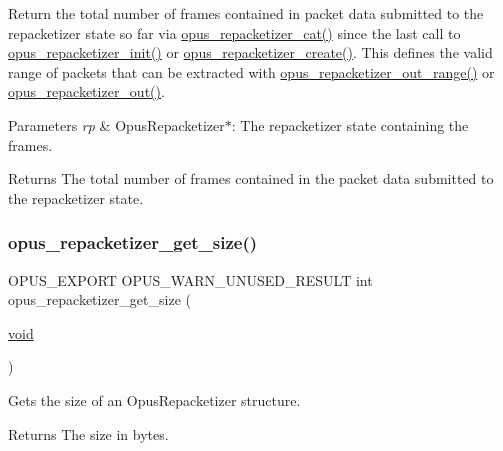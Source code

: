 Return the total number of frames contained in packet data submitted to the repacketizer state so far via \hyperlink{group__opus__repacketizer_gaa739f0bbc0ad09ad159ffb6455a6bb55}{opus\+\_\+repacketizer\+\_\+cat()} since the last call to \hyperlink{group__opus__repacketizer_gadef533688e80dcc96a32b955657aaf28}{opus\+\_\+repacketizer\+\_\+init()} or \hyperlink{group__opus__repacketizer_gaa70e9708619188f673b5dc3f494c46ea}{opus\+\_\+repacketizer\+\_\+create()}. This defines the valid range of packets that can be extracted with \hyperlink{group__opus__repacketizer_gad06762a8f4032823f6b64b63e8416efc}{opus\+\_\+repacketizer\+\_\+out\+\_\+range()} or \hyperlink{group__opus__repacketizer_gaa1b5f68279829dcbaf31d374b2f3eac4}{opus\+\_\+repacketizer\+\_\+out()}. 
\begin{DoxyParams}{Parameters}
{\em rp} & {\ttfamily Opus\+Repacketizer$\ast$}\+: The repacketizer state containing the frames. \\
\hline
\end{DoxyParams}
\begin{DoxyReturn}{Returns}
The total number of frames contained in the packet data submitted to the repacketizer state. 
\end{DoxyReturn}
\mbox{\label{group__opus__repacketizer_ga833b745bf92317e9ac26797a56eba6fd}} 
\subsubsection{\texorpdfstring{opus\+\_\+repacketizer\+\_\+get\+\_\+size()}{opus\_repacketizer\_get\_size()}}
{\footnotesize\ttfamily O\+P\+U\+S\+\_\+\+E\+X\+P\+O\+RT O\+P\+U\+S\+\_\+\+W\+A\+R\+N\+\_\+\+U\+N\+U\+S\+E\+D\+\_\+\+R\+E\+S\+U\+LT int opus\+\_\+repacketizer\+\_\+get\+\_\+size (\begin{DoxyParamCaption}\item[{\hyperlink{png_8h_ac9c84fa68bbad002983e35ce3663c686}{void}}]{ }\end{DoxyParamCaption})}

Gets the size of an {\ttfamily Opus\+Repacketizer} structure. \begin{DoxyReturn}{Returns}
The size in bytes. 
\end{DoxyReturn}
\mbox{\label{group__opus__repacketizer_gadef533688e80dcc96a32b955657aaf28}} 
